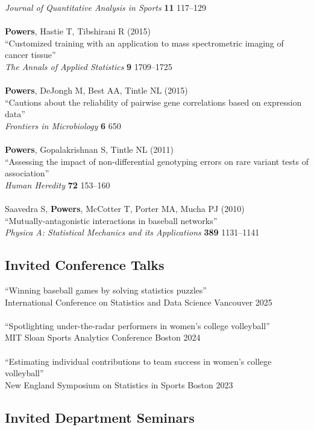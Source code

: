 \documentclass{article}
\begin{document}
{\it Journal of Quantitative Analysis in Sports} {\bf 11} 117--129\\
~\\
{\bf Powers}, Hastie T, Tibshirani R (2015)\\
``Customized training with an application to mass spectrometric imaging of cancer tissue''\\
{\it The Annals of Applied Statistics} {\bf 9} 1709--1725\\
~\\
{\bf Powers}, DeJongh M, Best AA, Tintle NL (2015)\\
``Cautions about the reliability of pairwise gene correlations based on expression data''\\
{\it Frontiers in Microbiology} {\bf 6} 650\\
~\\
{\bf Powers}, Gopalakrishnan S, Tintle NL (2011)\\
``Assessing the impact of non-differential genotyping errors on rare variant tests of association''\\
{\it Human Heredity} {\bf 72} 153--160\\
~\\
Saavedra S, {\bf Powers}, McCotter T, Porter MA, Mucha PJ (2010)\\
``Mutually-antagonistic interactions in baseball networks''\\
{\it Physica A: Statistical Mechanics and its Applications} {\bf 389} 1131--1141

\subsection*{\sc Invited Conference Talks}

``Winning baseball games by solving statistics puzzles''\\
International Conference on Statistics and Data Science \hfill Vancouver 2025\\
~\\
``Spotlighting under-the-radar performers in women's college volleyball''\\
MIT Sloan Sports Analytics Conference \hfill Boston 2024\\
~\\
``Estimating individual contributions to team success in women's college volleyball''\\
New England Symposium on Statistics in Sports \hfill Boston 2023

\subsection*{\sc Invited Department Seminars}
\end{document}
